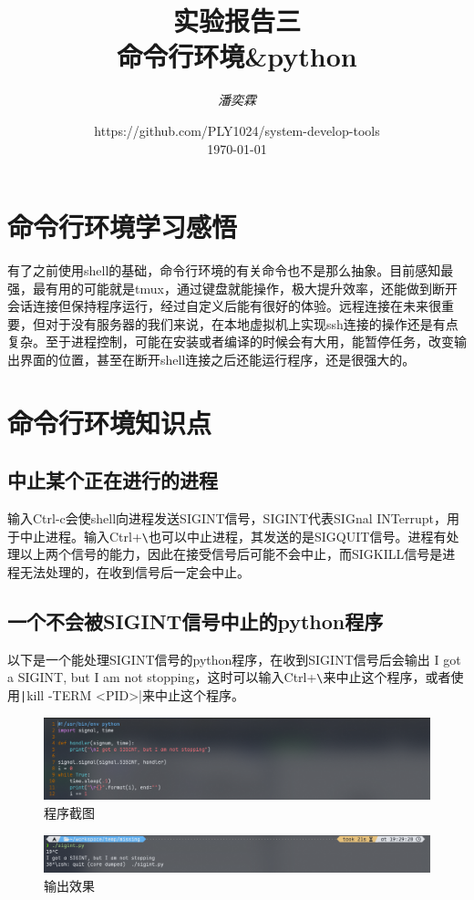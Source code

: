 \documentclass[fontset=ubuntu]{ctexart}
\title{\Huge \textbf{实验报告三 \\ 命令行环境\&python}}
\author{\textit{潘奕霖}}
\date{https://github.com/PLY1024/system-develop-tools\\ \today}
\begin{document}
\maketitle
\newpage

\tableofcontents
\newpage

\section{命令行环境学习感悟}
有了之前使用shell的基础，命令行环境的有关命令也不是那么抽象。目前感知最强，最有用的可能就是tmux，通过键盘就能操作，极大提升效率，还能做到断开会话连接但保持程序运行，经过自定义后能有很好的体验。远程连接在未来很重要，但对于没有服务器的我们来说，在本地虚拟机上实现ssh连接的操作还是有点复杂。至于进程控制，可能在安装或者编译的时候会有大用，能暂停任务，改变输出界面的位置，甚至在断开shell连接之后还能运行程序，还是很强大的。

\section{命令行环境知识点}
\subsection{中止某个正在进行的进程}
输入Ctrl-c会使shell向进程发送SIGINT信号，SIGINT代表SIGnal INTerrupt，用于中止进程。输入Ctrl+\verb|\|也可以中止进程，其发送的是SIGQUIT信号。进程有处理以上两个信号的能力，因此在接受信号后可能不会中止，而SIGKILL信号是进程无法处理的，在收到信号后一定会中止。

\subsection{一个不会被SIGINT信号中止的python程序}
以下是一个能处理SIGINT信号的python程序，在收到SIGINT信号后会输出
I got a SIGINT, but I am not stopping，这时可以输入Ctrl+\verb|\|来中止这个程序，或者使用\texttt|kill -TERM <PID>|来中止这个程序。
\begin{figure}[htb]
    \centering
    \includegraphics[width=0.75\linewidth]{Sigint.png}
    \caption{程序截图}
    \label{fig:Sigint}
\end{figure}
\begin{figure}[htb]
    \centering
    \includegraphics[width=0.75\linewidth]{Ctrl.png}
    \caption{输出效果}
    \label{fig:Ctrl}
\end{figure}
\end{document}
